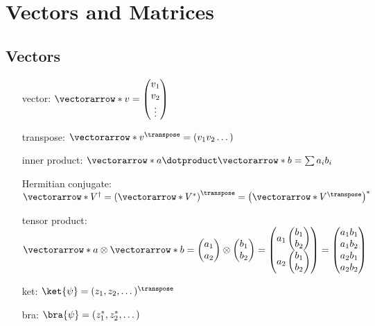 \section*{Vectors and Matrices}

\subsection*{Vectors}
\begin{itemize}
  \item [vector:] $\vectorarrow*{v}=\begin{pmatrix}v_1\\v_2\\ \vdots \end{pmatrix}$
  \item [transpose:] $\vectorarrow*{v}^\transpose=(v_1 v_2 \dotsc)$
  \item [inner product:] $\vectorarrow*{a} \dotproduct \vectorarrow*{b} =
    \sum a_ib_i$
  \item [Hermitian conjugate:] $\vectorarrow*{V}^\dagger =
    \left(\vectorarrow*{V}^*\right)^\transpose =
    \left(\vectorarrow*{V}^\transpose\right)^*$
  \item [tensor product:] $%
    \vectorarrow*{a} \otimes \vectorarrow*{b} = %
    \begin{pmatrix}a_1\\a_2\end{pmatrix}%
    \otimes %
    \begin{pmatrix}b_1\\b_2\end{pmatrix}%
    = \begin{pmatrix}a_1\begin{pmatrix}b_1\\b_2\end{pmatrix}
\\a_2\begin{pmatrix}b_1\\b_2\end{pmatrix}\end{pmatrix}
    = \begin{pmatrix}
      a_1b_1\\a_1b_2\\a_2b_1\\a_2b_2\end{pmatrix}
    $
  \item [ket:] $\ket{\psi} = (z_1, z_2, \dotsc)^\transpose$
  \item [bra:] $\bra{\psi} = (z^*_1, z^*_2, \dotsc)$
\end{itemize}

\subsection*{}
